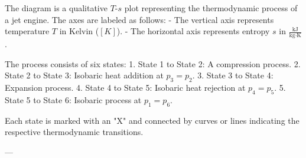 The diagram is a qualitative \( T \)-\( s \) plot representing the thermodynamic process of a jet engine. The axes are labeled as follows:  
- The vertical axis represents temperature \( T \) in Kelvin (\( [K] \)).  
- The horizontal axis represents entropy \( s \) in \( \frac{\text{kJ}}{\text{kg·K}} \).  

The process consists of six states:  
1. State 1 to State 2: A compression process.  
2. State 2 to State 3: Isobaric heat addition at \( p_3 = p_2 \).  
3. State 3 to State 4: Expansion process.  
4. State 4 to State 5: Isobaric heat rejection at \( p_4 = p_5 \).  
5. State 5 to State 6: Isobaric process at \( p_1 = p_6 \).  

Each state is marked with an "X" and connected by curves or lines indicating the respective thermodynamic transitions.

---